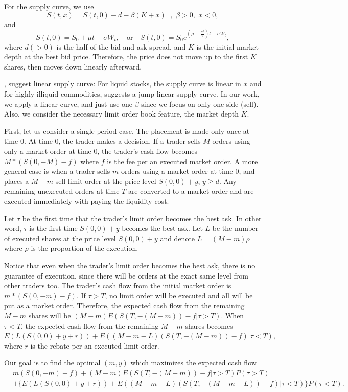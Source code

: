 \documentclass[11pt]{article}
\theoremstyle{plain}
\numberwithin{equation}{section}
\begin{document}
For the supply curve, we use
\[
S(t,x)=S(t,0)-d-\beta(K+x)^{-}, \,\, \beta>0,\,\,x<0,
\]
and 
\[
S(t,0)=S_0+\mu t+\sigma W_t,  \quad \text{or} \quad S(t,0)=S_0 e^{(\mu-\frac{\sigma^2 }{2}) t +\sigma W_t},
\]
where $d(>0)$ is the half of the bid and ask spread, and $K$ is the initial market depth at the best bid price. Therefore, the price does not move up to the first $K$ shares, then moves down linearly afterward.{ \cite{BP:2010}, \cite{CJP:2003} suggest linear supply curve: For liquid stocks, the supply curve is linear in $x$ and for highly illiquid commodities, \cite{BP:2010} suggests a jump-linear supply curve. In our work, we apply a linear curve, and just use one $\beta$ since we focus on only one side (sell). Also, we consider the necessary limit order book feature, the market depth $K$. 


First, let us consider a single period case. The placement is made only once at time $0$. At time $0$, the trader makes a decision. If a trader sells $M$ orders using only a market order at time 0, the trader's cash flow becomes $M*(S(0,-M)-f )$ where $f$ is the fee per an executed market order. A more general case is when a trader sells $m$ orders using a market order at time 0, and places a $M-m$ sell limit order at the price level $S(0,0)+y$, $y\geq d$. Any remaining unexecuted orders at time $T$ are converted to a market order and  are executed immediately with paying the liquidity cost.

Let $\tau$ be the first time that the trader's limit order becomes the best ask. In other word, $\tau$ is the first time $S(0,0)+y$ becomes the best ask. Let $L$ be the number of executed shares at the price level $S(0,0)+y$ and denote $L=(M-m)\rho$ where $\rho$ is the proportion of the execution. 


Notice that even when the trader's limit order becomes the best ask, there is no guarantee of execution, since there will be orders at the exact same level from other traders too.
The trader's cash flow from the initial market order is $m*(S(0, -m)-f)$. If $\tau>T$, no limit order will be executed and all will be put as a market order. Therefore, the expected cash flow from the remaining $M-m$ shares will be $(M-m)E(S(T,-(M-m))-f|\tau>T).$
When $\tau<T$, the expected cash flow from the remaining $M-m$ shares becomes $E(L(S({0},0)+y+r))+E((M-m-L)(S(T,-(M-m))-f)   |\tau<T), $
where $r$ is the rebate per an executed limit order.

Our goal is to find the optimal $(m,y)$ which maximizes the expected cash flow
\begin{align}\nonumber
&m(S(0, -m)-f) +(M-m)E(S(T,-(M-m))-f|\tau>T)P(\tau>T) \\
&+\{E(L (S(0,0)+y+r))+E ((M-m-L)(S(T,-(M-m-L))-f)   |\tau<T)\}P(\tau<T).
\label{ECF_lem3}
\end{align}


}
\end{document}
